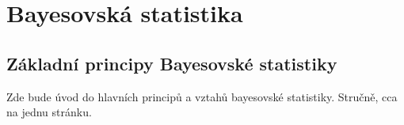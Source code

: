 \chapter{Bayesovská statistika}
\label{chap:bayes}
\section{Základní principy Bayesovské statistiky}
\label{sec:bayes-principy}
Zde bude úvod do hlavních principů a vztahů bayesovské statistiky. Stručně, cca na jednu stránku.
